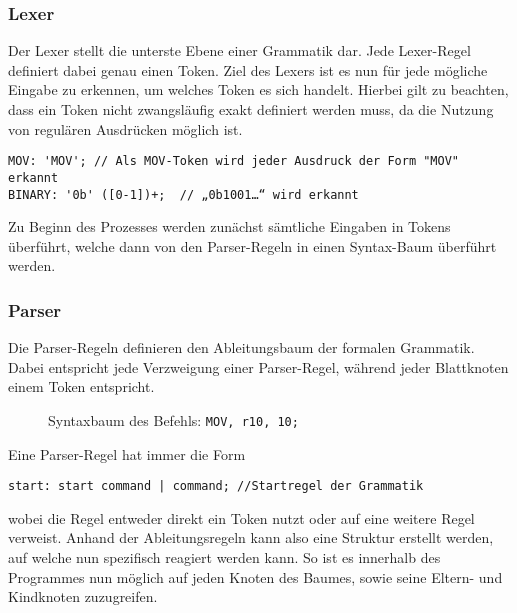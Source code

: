 \documentclass[paper=a4,fontsize=12pt,twocolumn]{scrreprt}
\begin{document}
\subsubsection{Lexer}
Der Lexer stellt die unterste Ebene einer Grammatik dar.
Jede Lexer-Regel definiert dabei genau einen Token.
Ziel des Lexers ist es nun für jede mögliche Eingabe zu erkennen, um welches Token es sich handelt.
Hierbei gilt zu beachten, dass ein Token nicht zwangsläufig exakt definiert werden muss, da die Nutzung von regulären Ausdrücken möglich ist.
\begin{lstlisting}
MOV: 'MOV'; // Als MOV-Token wird jeder Ausdruck der Form "MOV" erkannt
BINARY: '0b' ([0-1])+;  // „0b1001…“ wird erkannt
\end{lstlisting}
Zu Beginn des Prozesses werden zunächst sämtliche Eingaben in Tokens überführt, welche dann von den Parser-Regeln in einen Syntax-Baum überführt werden.

\subsubsection{Parser}
Die Parser-Regeln definieren den Ableitungsbaum der formalen Grammatik.
Dabei entspricht jede Verzweigung einer Parser-Regel, während jeder Blattknoten einem Token entspricht.

\begin{figure}[h]
\centering
\caption{Syntaxbaum des Befehls: \texttt{MOV, r10, 10;}}
\end{figure}

Eine Parser-Regel hat immer die Form
\begin{lstlisting}
start: start command | command; //Startregel der Grammatik
\end{lstlisting}
wobei die Regel entweder direkt ein Token nutzt oder auf eine weitere Regel verweist.
Anhand der Ableitungsregeln kann also eine Struktur erstellt werden, auf welche nun spezifisch reagiert werden kann.
So ist es innerhalb des Programmes nun möglich auf jeden Knoten des Baumes, sowie seine Eltern- und Kindknoten zuzugreifen.
\end{document}
